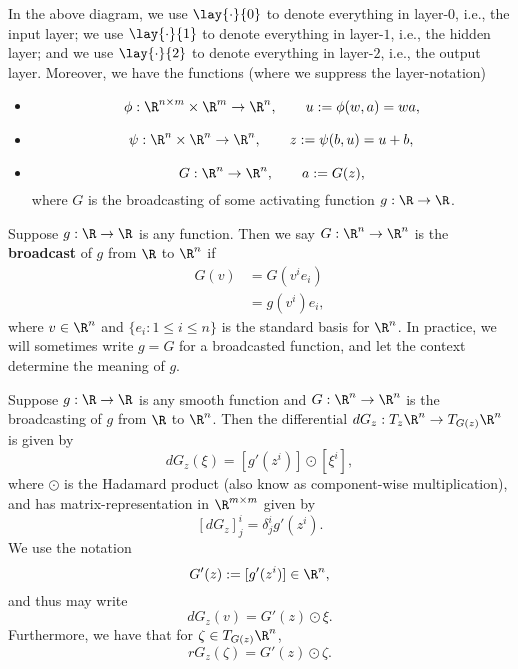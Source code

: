 In the above diagram, we use $\lay{\cdot}{0}$ to denote everything in layer-$0$, i.e., the input layer; we use $\lay{\cdot}{1}$ to denote everything in layer-$1$, i.e., the hidden layer; and we use $\lay{\cdot}{2}$ to denote everything in layer-$2$, i.e., the output layer.  Moreover, we have the functions (where we suppress the layer-notation)
\begin{itemize}
	\item $$\phi:\R^{n\times m}\times\R^m\to\R^n,\qquad u:=\phi(w,a)=wa,$$
	\item $$\psi:\R^n\times\R^n\to\R^n,\qquad z:=\psi(b,u)=u+b,$$
	\item $$G:\R^n\to\R^n,\qquad a:=G(z),$$
	where $G$ is the broadcasting of some activating function $g:\R\to\R$.
\end{itemize}


\begin{defn}
	Suppose $g:\R\to\R$ is any function.  Then we say $G:\R^n\to\R^n$ is the \textbf{broadcast} of $g$ from $\R$ to $\R^n$ if
	\begin{align*}
		G(v)&=G(v^ie_i)\\
		&=g(v^i)e_i,
	\end{align*}
	where $v\in\R^{n}$ and $\{e_i:1\leq i\leq n\}$ is the standard basis for $\R^n$.  In practice, we will sometimes write $g=G$ for a broadcasted function, and let the context determine the meaning of $g$.
\end{defn}

\begin{lem}\label{lem: broadcastingDifferential}
	Suppose $g:\R\to\R$ is any smooth function and $G:\R^n\to\R^n$ is the broadcasting of $g$ from $\R$ to $\R^n$.  Then the differential $dG_z:T_z\R^n\to T_{G(z)}\R^n$ is given by
	$$dG_z(\xi)=[g'(z^i)]\odot [\xi^i],$$
	where $\odot$ is the Hadamard product (also know as component-wise multiplication), and has matrix-representation in $\R^{m\times m}$ given by
	$$[dG_z]^i_j =\delta^i_j g'(z^i).$$
	We use the notation
	$$G'(z):=[g'(z^i)]\in\R^n,$$
	and thus may write
	$$dG_z(v)=G'(z)\odot \xi.$$
	Furthermore, we have that for $\zeta\in T_{G(z)}\R^n$,
	$$rG_z(\zeta)=G'(z)\odot\zeta.$$
\end{lem}

